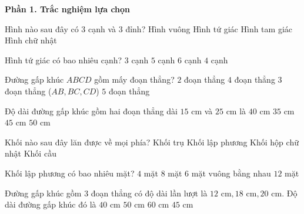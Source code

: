 \textbf{Phần 1. Trắc nghiệm lựa chọn}

\begin{ex} %
Hình nào sau đây có 3 cạnh và 3 đỉnh?
\choice
{Hình vuông}
{Hình tứ giác}
{\True Hình tam giác}
{Hình chữ nhật}
\end{ex}

\begin{ex} %
Hình tứ giác có bao nhiêu cạnh?
\choice
{$3$ cạnh}
{$5$ cạnh}
{$6$ cạnh}
{\True $4$ cạnh}
\end{ex}

\begin{ex} %
Đường gấp khúc $ABCD$ gồm mấy đoạn thẳng?
\choice
{$2$ đoạn thẳng}
{$4$ đoạn thẳng}
{\True $3$ đoạn thẳng ($AB, BC, CD$)}
{$5$ đoạn thẳng}
\end{ex}

\begin{ex} %
Độ dài đường gấp khúc gồm hai đoạn thẳng dài $15\text{ cm}$ và $25\text{ cm}$ là
\choice
{\True $40\text{ cm}$}
{$35\text{ cm}$}
{$45\text{ cm}$}
{$50\text{ cm}$}
\end{ex}

\begin{ex} %
Khối nào sau đây lăn được về mọi phía?
\choice
{Khối trụ}
{Khối lập phương}
{Khối hộp chữ nhật}
{\True Khối cầu}
\end{ex}

\begin{ex} %
Khối lập phương có bao nhiêu mặt?
\choice
{$4$ mặt}
{$8$ mặt}
{\True $6$ mặt vuông bằng nhau}
{$12$ mặt}
\end{ex}

\begin{ex} %
Đường gấp khúc gồm 3 đoạn thẳng có độ dài lần lượt là $12\text{ cm}, 18\text{ cm}, 20\text{ cm}$. Độ dài đường gấp khúc đó là
\choice
{$40\text{ cm}$}
{\True $50\text{ cm}$}
{$60\text{ cm}$}
{$45\text{ cm}$}
\end{ex}

